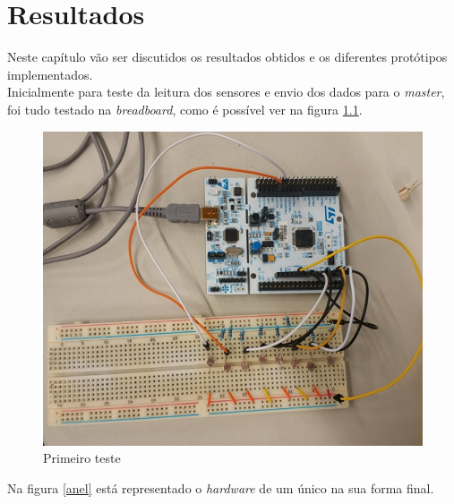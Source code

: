 \chapter{Resultados}

Neste capítulo vão ser discutidos os resultados obtidos e os diferentes protótipos implementados.
\\Inicialmente para teste da leitura dos sensores e envio dos dados para o \textit{master}, foi tudo testado na \textit{breadboard}, como é possível ver na figura \ref{test}.

\begin{figure}[!htb]
\centering
\includegraphics[scale=0.35]{Figuras/test.PNG}
\caption{Primeiro teste}
\label{test}
\end{figure}

Na figura \ref{anel} está representado o \textit{hardware} de um único na sua forma final.

